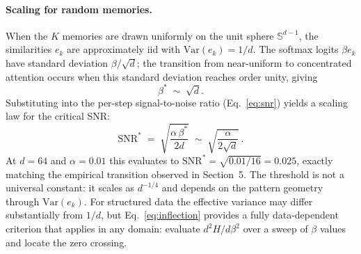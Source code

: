 \paragraph{Scaling for random memories.}
When the $K$ memories are drawn uniformly on the unit sphere $\mathbb{S}^{d-1}$, the similarities $e_k$ are approximately iid with $\mathrm{Var}(e_k)=1/d$. The softmax logits $\beta e_k$ have standard deviation $\beta/\sqrt{d}$; the transition from near-uniform to concentrated attention occurs when this standard deviation reaches order unity, giving
\begin{equation}\label{eq:beta-star-scaling}
\beta^{*} \;\sim\; \sqrt{d}.
\end{equation}
Substituting into the per-step signal-to-noise ratio (Eq.~\ref{eq:snr}) yields a scaling law for the critical SNR:
\begin{equation}\label{eq:snr-star}
\mathrm{SNR}^{*} \;=\; \sqrt{\frac{\alpha\,\beta^{*}}{2d}} \;\sim\; \sqrt{\frac{\alpha}{2\sqrt{d}}}\,.
\end{equation}
At $d{=}64$ and $\alpha{=}0.01$ this evaluates to $\mathrm{SNR}^{*}=\sqrt{0.01/16}=0.025$, exactly matching the empirical transition observed in Section~5. The threshold is not a universal constant: it scales as $d^{-1/4}$ and depends on the pattern geometry through $\mathrm{Var}(e_k)$. For structured data the effective variance may differ substantially from $1/d$, but Eq.~\eqref{eq:inflection} provides a fully data-dependent criterion that applies in any domain: evaluate $d^{2}H/d\beta^{2}$ over a sweep of $\beta$ values and locate the zero crossing.
